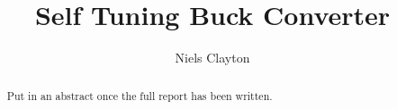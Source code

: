 \documentclass[11pt, a4paper, oneside]{report}
\title{Self Tuning Buck Converter}
\author{Niels Clayton}
\date{}
\begin{document}
\frontmatter


\begin{abstract}

Put in an abstract once the full report has been written.

\end{abstract}


\maketitle


% 
\tableofcontents


\mainmatter










\backmatter




% 

\end{document}
